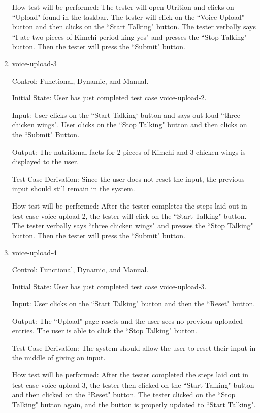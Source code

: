 \documentclass[12pt, titlepage]{article}
\begin{document}
\begin{enumerate}
	How test will be performed: The tester will open Utrition and clicks on ``Upload" found in the taskbar. The tester will click on the ``Voice Upload" button and then clicks on the ``Start Talking" button. The tester verbally says ``I ate two pieces of Kimchi period king yes" and presses the ``Stop Talking" button. Then the tester will press the ``Submit" button.
	
	\item{voice-upload-3\\}
	
	Control: Functional, Dynamic, and Manual.
	
	Initial State: User has just completed test case voice-upload-2.
	
	Input: User clicks on the ``Start Talking` button and says out loud ``three chicken wings". User clicks on the ``Stop Talking" button and then clicks on the ``Submit" Button.
	
	Output: The nutritional facts for 2 pieces of Kimchi and 3 chicken wings is displayed to the user.
	
	Test Case Derivation: Since the user does not reset the input, the previous input should still remain in the system.
	
	How test will be performed: After the tester completes the steps laid out in test case voice-upload-2, the tester will click on the ``Start Talking" button. The tester verbally says ``three chicken wings" and presses the ``Stop Talking" button. Then the tester will press the ``Submit" button.
	
	\item{voice-upload-4\\}
	
	Control: Functional, Dynamic, and Manual.
	
	Initial State: User has just completed test case voice-upload-3.
	
	Input: User clicks on the ``Start Talking" button and then the ``Reset" button.
	
	Output: The ``Upload" page resets and the user sees no previous uploaded entries. The user is able to click the ``Stop Talking" button.
	
	Test Case Derivation: The system should allow the user to reset their input in the middle of giving an input.
	
	How test will be performed: After the tester completed the steps laid out in test case voice-upload-3, the tester then clicked on the ``Start Talking" button and then clicked on the ``Reset" button. The tester clicked on the ``Stop Talking" button again, and the button is properly updated to ``Start Talking".
	

\end{enumerate}
\end{document}
